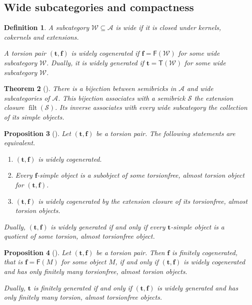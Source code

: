 \documentclass[10pt,a4paper]{amsart}
\newtheorem{theorem}{Theorem}[section]
\newtheorem{proposition}[theorem]{Proposition}
\newtheorem{definition}[theorem]{Definition}
\newcommand{\A}{\mathcal A}
\newcommand{\W}{\mathcal W}
\newcommand{\T}{\mathsf T}
\newcommand{\F}{\mathsf F}
\newcommand{\filt}{\operatorname{filt}}
\begin{document}
\subsection{Wide subcategories and compactness}

\begin{definition}
A subcategory \(\W\subseteq\A\) is wide if it is closed under kernels, cokernels and extensions.

A torsion pair \((\mathbf t,\mathbf f)\) is widely cogenerated if \(\mathbf f=\F(\W)\) for some wide subcategory \(\W\). Dually, it is widely generated if \(\mathbf t=\T(\W)\) for some wide subcategory \(\W\).
\end{definition}

\begin{theorem}[{\cite[Section 1.2]{RingelSpecies}}]\label{thm:ringel-semibricks}
There is a bijection between semibricks in \(\A\) and wide subcategories of \(\A\). This bijection associates with a semibrick \(\mathcal S\) the extension closure \(\filt(\mathcal S)\). Its inverse associates with every wide subcategory the collection of its simple objects.
\end{theorem}

\begin{proposition}[{\cite[Proposition 5.2]{EnomotoMonobrick}}]\label{prop:wide-cogenerated-criterion}
Let \((\mathbf t,\mathbf f)\) be a torsion pair. The following statements are equivalent.
\begin{enumerate}[label=\textup{(\arabic*)},leftmargin=2.5em]
\item \((\mathbf t,\mathbf f)\) is widely cogenerated.
\item Every \(\mathbf f\)-simple object is a subobject of some torsionfree, almost torsion object for \((\mathbf t,\mathbf f)\).
\item \((\mathbf t,\mathbf f)\) is widely cogenerated by the extension closure of its torsionfree, almost torsion objects.
\end{enumerate}
Dually, \((\mathbf t,\mathbf f)\) is widely generated if and only if every \(\mathbf t\)-simple object is a quotient of some torsion, almost torsionfree object.
\end{proposition}

\begin{proposition}[{\cite[Corollary 5.6]{RingelBrickChain}}]\label{prop:finitely-cogenerated}
Let \((\mathbf t,\mathbf f)\) be a torsion pair. Then \(\mathbf f\) is finitely cogenerated, that is \(\mathbf f=\F(M)\) for some object \(M\), if and only if \((\mathbf t,\mathbf f)\) is widely cogenerated and has only finitely many torsionfree, almost torsion objects.

Dually, \(\mathbf t\) is finitely generated if and only if \((\mathbf t,\mathbf f)\) is widely generated and has only finitely many torsion, almost torsionfree objects.
\end{proposition}
\end{document}
